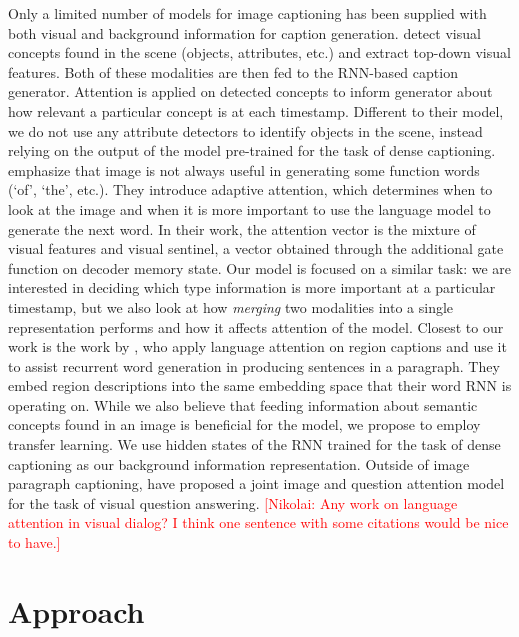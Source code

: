 \documentclass[11pt,a4paper]{article}
\newcommand{\kibitz}[2]{\ifnum\Comments=1\textcolor{#1}{#2}\fi}
\newcommand{\nikolai}[1]{\kibitz{red}      {[Nikolai: #1]}}
\begin{document}
Only a limited number of models for image captioning has been supplied with both visual and background information for caption generation.
 detect visual concepts found in the scene (objects, attributes, etc.) and extract top-down visual features.
Both of these modalities are then fed to the RNN-based caption generator.
Attention is applied on detected concepts to inform generator about how relevant a particular concept is at each timestamp. Different to their model, we do not use any attribute detectors to identify objects in the scene, instead relying on the output of the model pre-trained for the task of dense captioning.
 emphasize that image is not always useful in generating some function words (`of', `the', etc.).
They introduce adaptive attention, which determines when to look at the image and when it is more important to use the language model to generate the next word.
In their work, the attention vector is the mixture of visual features and visual sentinel, a vector obtained through the additional gate function on decoder memory state.
Our model is focused on a similar task: we are interested in deciding which type information is more important at a particular timestamp, but we also look at how \textit{merging} two modalities into a single representation performs and how it affects attention of the model.
Closest to our work is the work by \cite{liang2017recurrent}, who apply language attention on region captions and use it to assist recurrent word generation in producing sentences in a paragraph. They embed region descriptions into the same embedding space that their word RNN is operating on. While we also believe that feeding information about semantic concepts found in an image is beneficial for the model, we propose to employ transfer learning. We use hidden states of the RNN trained for the task of dense captioning \cite{densecap} as our background information representation.
Outside of image paragraph captioning,  have proposed a joint image and question attention model for the task of visual question answering.
\nikolai{Any work on language attention in visual dialog? I think one sentence with some citations would be nice to have.}


\section{Approach}
\end{document}
